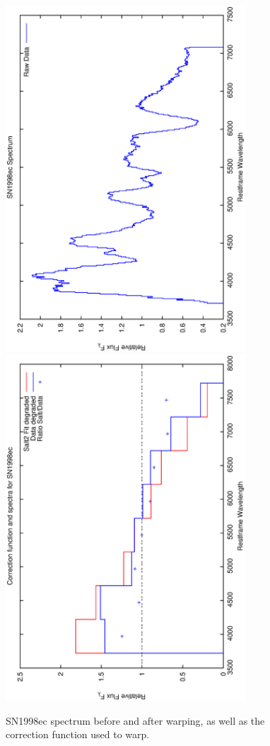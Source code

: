 \clearpage

\begin{figure}[p]
\centering
\includegraphics[angle=-90,width=0.8\textwidth]{./figures/spectrabeforeafter/SN1998ec_handpicked_v001_v027_before_after_spectra.ps}
\hfill
\includegraphics[angle=-90,width=0.8\textwidth]{./figures/corrections/SN1998ec_v001_correction.ps}
\hfill
\caption{SN1998ec spectrum before and after warping, as well as the correction function used to warp.}
\label{fig:SN1998ecfour1}
\end{figure}

